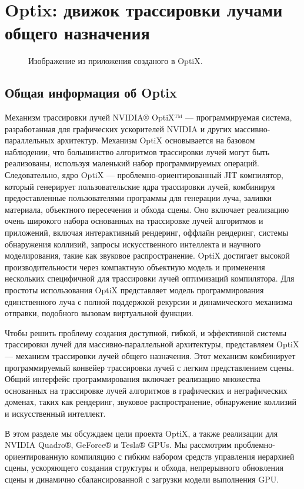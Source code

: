 \section{Optix: движок трассировки лучами общего назначения}
\begin{figure}[h]
\caption{Изображение из приложения созданого в OptiX.}
\label{audi}
\end{figure}
\subsection{Общая информация об Optix}
Механизм трассировки лучей NVIDIA® OptiX™ --- программируемая система, разработанная для графических ускорителей NVIDIA и других массивно-параллельных архитектур.
Механизм OptiX основывается на базовом наблюдении, что большинство алгоритмов трассировки лучей могут быть реализованы, используя маленький набор программируемых операций. 
Следовательно, ядро OptiX --- проблемно-ориентированный JIT компилятор, который генерирует пользовательские ядра трассировки лучей, комбинируя предоставленные пользователями программы для генерации луча, заливки материала, объектного пересечения и обхода сцены. 
Оно включает реализацию очень широкого набора основанных на трассировке лучей алгоритмов и приложений, включая интерактивный рендеринг, оффлайн рендеринг, системы обнаружения коллизий, запросы искусственного интеллекта и научного моделирования, такие как звуковое распространение. 
OptiX достигает высокой производительности через компактную объектную модель и применения нескольких специфичной для трассировки лучей оптимизаций компилятора. 
Для простоты использования OptiX представляет модель программирования единственного луча с полной поддержкой рекурсии и динамического механизма отправки, подобного вызовам виртуальной функции.

Чтобы решить проблему создания доступной, гибкой, и эффективной системы трассировки лучей для массивно-параллельной архитектуры, представляем OptiX --- механизм трассировки лучей общего назначения. 
Этот механизм комбинирует программируемый конвейер трассировки лучей с легким представлением сцены. 
Общий интерфейс программирования включает реализацию множества основанных на трассировке лучей алгоритмов в графических и неграфических доменах, таких как рендеринг, звуковое распространение, обнаружение коллизий и искусственный интеллект.

В этом разделе мы обсуждаем цели проекта OptiX, а также реализации для NVIDIA Quadro®, GeForce® и Tesla® GPUs. 
Мы рассмотрим проблемно-ориентированную компиляцию с гибким набором средств управления иерархией сцены, ускоряющего создания структуры и обхода, непрерывного обновления сцены и динамично сбалансированной с загрузки модели выполнения GPU. 

